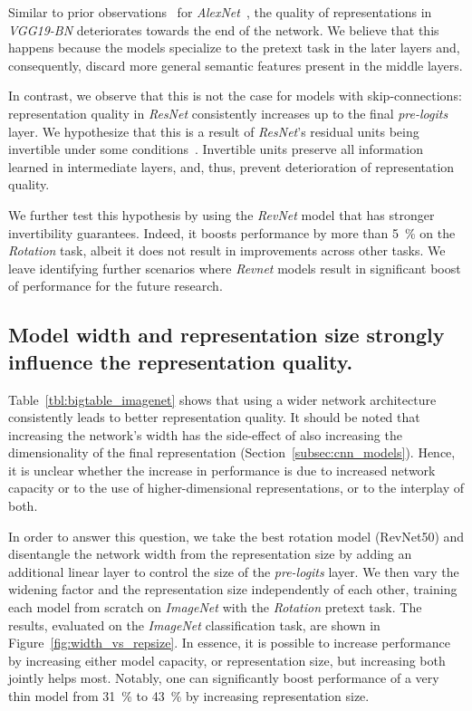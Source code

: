 \documentclass[10pt,twocolumn,letterpaper]{article}
\begin{document}
Similar to prior observations~\cite{gidaris2018unsupervised,zhang2017split,noroozi2016unsupervised} for \emph{AlexNet}~\cite{krizhevsky2012imagenet}, the quality of representations in \emph{VGG19-BN} deteriorates towards the end of the network.
We believe that this happens because the models specialize to the pretext task in the later layers and, consequently, discard more general semantic features
present in the middle layers.

In contrast, we observe that this is not the case for models with skip-connections:
representation quality in \emph{ResNet} consistently increases up to the final \emph{pre-logits} layer.
We hypothesize that this is a result of \emph{ResNet}'s residual units being
invertible under some conditions~\cite{behrmann2018invertible}.
Invertible units preserve all information learned in intermediate layers, and, thus, prevent deterioration of representation quality.

We further test this hypothesis by using the \emph{RevNet} model that has stronger invertibility guarantees.
Indeed, it boosts performance by more than \SI{5}{\percent} on the \emph{Rotation} task, albeit it does not result in improvements across other tasks.
We leave identifying further scenarios where \emph{Revnet} models result in significant boost of performance for the future research.

\subsection{Model width and representation size strongly influence the representation quality.}
\label{subsec:width_vs_size}

Table~\ref{tbl:bigtable_imagenet} shows that using a wider network architecture consistently leads to better representation quality.
It should be noted that increasing the network's width has the side-effect of also increasing the dimensionality of the final representation (Section~\ref{subsec:cnn_models}).
Hence, it is unclear whether the increase in performance is due to increased network capacity or to the use of higher-dimensional representations, or to the interplay of both.


In order to answer this question, we take the best rotation model (RevNet50) and disentangle the network width from the representation size by adding an additional linear layer to control the size of the \emph{pre-logits} layer.
We then vary the widening factor and the representation size independently of each other, training each model from scratch on \emph{ImageNet} with the \emph{Rotation} pretext task.
The results, evaluated on the \emph{ImageNet} classification task, are shown in Figure~\ref{fig:width_vs_repsize}.
In essence, it is possible to increase performance by increasing either model capacity, or representation size, but increasing both jointly helps most.
Notably, one can significantly boost performance of a very thin model from \SI{31}{\percent} to \SI{43}{\percent} by increasing representation size.
\end{document}
